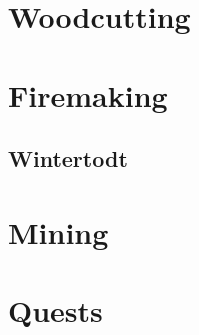 \documentclass[10pt,a4paper]{report}
\begin{document}
	\part{Woodcutting}
	\part{Firemaking}
		\chapter{Wintertodt}
			
	\part{Mining}
	\part{Quests}



\end{document}
